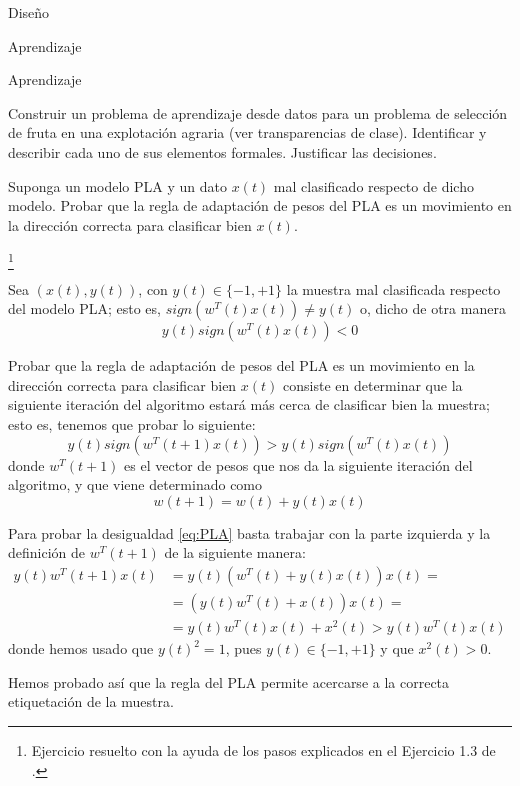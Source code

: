 \documentclass[a4paper, 11pt]{article}
\begin{document}
    \begin{solucion}
        Diseño

        Aprendizaje

        Aprendizaje
    \end{solucion}

    \begin{ejercicio}
        Construir un problema de aprendizaje desde datos para un problema de selección de fruta en una explotación agraria (ver transparencias de clase). Identificar y describir cada uno de sus elementos formales. Justificar las decisiones.
    \end{ejercicio}

    \begin{ejercicio}
        Suponga un modelo PLA y un dato $x(t)$ mal clasificado respecto de dicho modelo. Probar que la regla de adaptación de pesos del PLA es un movimiento en la dirección correcta para clasificar bien $x(t)$.
    \end{ejercicio}

    \begin{solucion}\footnote{Ejercicio resuelto con la ayuda de los pasos explicados en el Ejercicio 1.3 de \cite{mostafa2012learning}.}

        Sea $(x(t), y(t))$, con $y(t) \in \{-1, +1\}$ la muestra mal clasificada respecto del modelo PLA; esto es, $sign(w^T(t) x(t)) \neq y(t)$ o, dicho de otra manera
        \[
        y(t) sign(w^T(t) x(t)) < 0
        \]

        Probar que la regla de adaptación de pesos del PLA es un movimiento en la dirección correcta para clasificar bien $x(t)$ consiste en determinar que la siguiente iteración del algoritmo estará más cerca de clasificar bien la muestra; esto es, tenemos que probar lo siguiente:
        \begin{equation}
            y(t) sign(w^T(t+1) x(t)) > y(t) sign(w^T(t) x(t))
            \label{eq:PLA}
        \end{equation}
        donde $w^T(t+1)$ es el vector de pesos que nos da la siguiente iteración del algoritmo, y que viene determinado como
        \[
        w(t+1) = w(t) + y(t)x(t)
        \]

        Para probar la desigualdad \ref{eq:PLA} basta trabajar con la parte izquierda y la definición de $w^T(t+1)$ de la siguiente manera:
        \begin{align*}
            y(t) w^T(t+1) x(t) &= y(t) (w^T(t) + y(t)x(t)) x(t) = \\
            &= (y(t)w^T(t) + x(t)) x(t) = \\
            &= y(t)w^T(t)x(t) + x^2(t) > y(t)w^T(t)x(t)
        \end{align*}
        donde hemos usado que $y(t)^2 = 1$, pues $y(t) \in \{-1, +1\}$ y que $x^2(t) > 0$.

        Hemos probado así que la regla del PLA permite acercarse a la correcta etiquetación de la muestra.
    \end{solucion}
\end{document}
